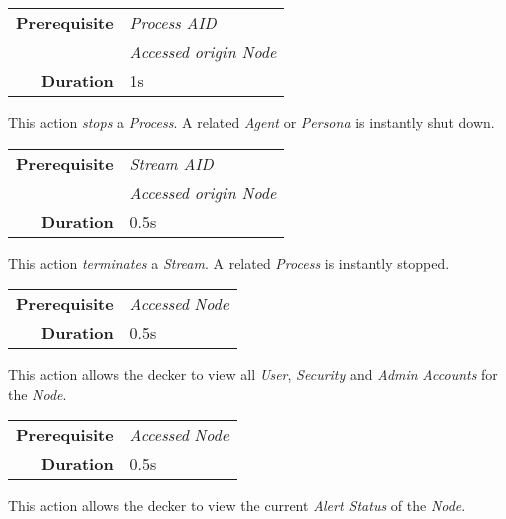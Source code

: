 \begin{tabular}{rl}
    \textbf{Prerequisite} & \emph{Process AID}          \\
                          & \emph{Accessed origin Node} \\
    \textbf{Duration}     & 1s                          \\
\end{tabular}

\hfill

This action \emph{stops} a \emph{Process}. A related \emph{Agent} or \emph{Persona}
is instantly shut down.


\label{par:terminate}


\begin{tabular}{rl}
    \textbf{Prerequisite} & \emph{Stream AID}           \\
                          & \emph{Accessed origin Node} \\
    \textbf{Duration}     & 0.5s                        \\
\end{tabular}

\hfill

This action \emph{terminates} a \emph{Stream}. A related \emph{Process}
is instantly stopped.

\label{par:view accounts}


\begin{tabular}{rl}
    \textbf{Prerequisite} & \emph{Accessed} \emph{Node} \\
    \textbf{Duration}     & 0.5s                        \\
\end{tabular}

\hfill

This action allows the decker to view all \emph{User}, \emph{Security} and
\emph{Admin} \emph{Accounts} for the \emph{Node}.

\label{par:view alert status}


\begin{tabular}{rl}
    \textbf{Prerequisite} & \emph{Accessed} \emph{Node} \\
    \textbf{Duration}     & 0.5s                        \\
\end{tabular}

\hfill

This action allows the decker to view the current \emph{Alert Status} of the
\emph{Node}.

